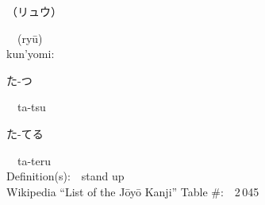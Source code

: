 \begin{multicols}{2}
{\hspace*{2em}}{\begin{CJK}{UTF8}{min} （リュウ） \end{CJK}}\ \ (ry\=u)\ \ \\
{\hspace*{1em}}kun'yomi:\ \ \\
{\hspace*{2em}}{\begin{CJK}{UTF8}{min} た-つ \end{CJK}}\ \ ta-tsu\ \ \\
{\hspace*{2em}}{\begin{CJK}{UTF8}{min} た-てる \end{CJK}}\ \ ta-teru\ \ \\
Definition(s):\ \ stand up \\
Wikipedia ``List of the J\=oy\=o Kanji'' Table \#:\ \ 2\,045 \\
\ \ \\
\end{multicols}



